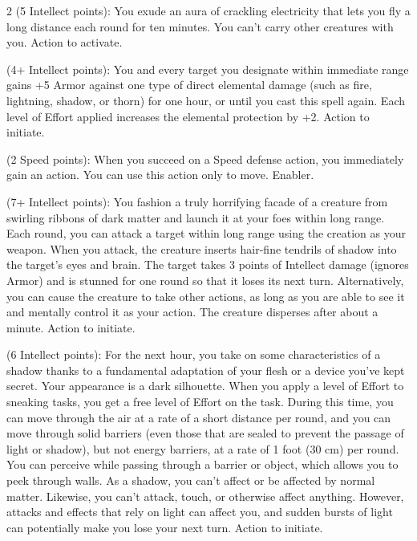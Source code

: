 \begin{multicols}{2}
 (5 Intellect points): You exude an aura of crackling electricity that lets you fly a long distance each round for ten minutes. You can’t carry other creatures with you. Action to activate. 
 
 (4+ Intellect points): You and every target you designate within immediate range gains +5 Armor against one type of direct elemental damage (such as fire, lightning, shadow, or thorn) for one hour, or until you cast this spell again. Each level of Effort applied increases the elemental protection by +2. Action to initiate. 
 
 (2 Speed points): When you succeed on a Speed defense action, you immediately gain an action. You can use this action only to move. Enabler. 
 
 (7+ Intellect points): You fashion a truly horrifying facade of a creature from swirling ribbons of dark matter and launch it at your foes within long range. Each round, you can attack a target within long range using the creation as your weapon. When you attack, the creature inserts hair-fine tendrils of shadow into the target’s eyes and brain. The target takes 3 points of Intellect damage (ignores Armor) and is stunned for one round so that it loses its next turn. Alternatively, you can cause the creature to take other actions, as long as you are able to see it and mentally control it as your action. The creature disperses after about a minute. Action to initiate. 
 
 (6 Intellect points): For the next hour, you take on some characteristics of a shadow thanks to a fundamental adaptation of your flesh or a device you’ve kept secret. Your appearance is a dark silhouette. When you apply a level of Effort to sneaking tasks, you get a free level of Effort on the task. During this time, you can move through the air at a rate of a short distance per round, and you can move through solid barriers (even those that are sealed to prevent the passage of light or shadow), but not energy barriers, at a rate of 1 foot (30 cm) per round. You can perceive while passing through a barrier or object, which allows you to peek through walls. As a shadow, you can’t affect or be affected by normal matter. Likewise, you can’t attack, touch, or otherwise affect anything. However, attacks and effects that rely on light can affect you, and sudden bursts of light can potentially make you lose your next turn. Action to initiate. 
 

\end{multicols}
